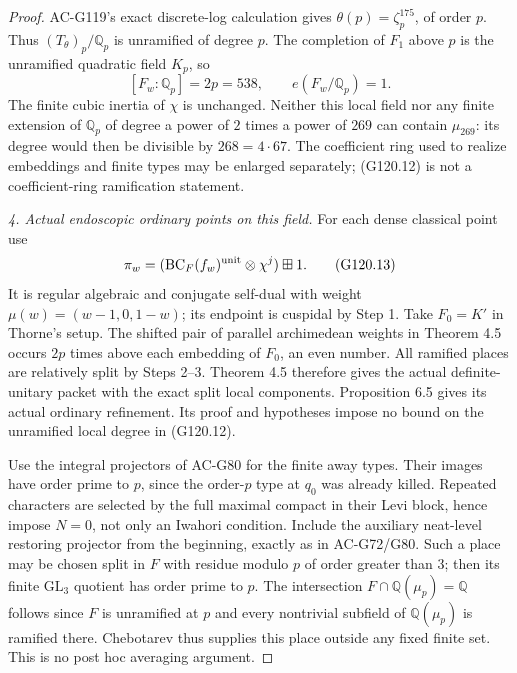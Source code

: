 \begin{proof}
AC-G119's exact discrete-log calculation gives
$\theta(p)=\zeta_p^{175}$, of order $p$.
Thus $(T_\theta)_p/\mathbb Q_p$ is unramified of degree $p$.
The completion of $F_1$ above $p$ is the unramified quadratic
field $K_p$, so
\[
                    [F_w:\mathbb Q_p]=2p=538,\qquad e(F_w/\mathbb Q_p)=1.
                                                                    \tag{G120.12}
\]
The finite cubic inertia of $\chi$ is unchanged.
Neither this local field nor any finite extension of $\mathbb Q_p$
of degree a power of $2$ times a power of $269$ can contain
$\mu_{269}$: its degree would
then be divisible by $268=4\cdot67$.
The coefficient ring used to realize embeddings and finite types
may be enlarged separately; (G120.12) is not a coefficient-ring
ramification statement.

\emph{4. Actual endoscopic ordinary points on this field.}
For each dense classical point use
\[
          \pi_w=(\operatorname{BC}_F(f_w)^{\rm unit}\otimes\chi^j)
                         \boxplus1 .                              \tag{G120.13}
\]
It is regular algebraic and conjugate self-dual with weight
$\mu(w)=(w-1,0,1-w)$; its endpoint is cuspidal by Step 1.
Take $F_0=K'$ in Thorne's setup.  The shifted pair of parallel
archimedean weights in Theorem 4.5 occurs $2p$ times above
each embedding of $F_0$, an even number.  All ramified places
are relatively split by Steps 2--3.  Theorem 4.5 therefore
gives the actual definite-unitary packet with the exact split
local components.  Proposition 6.5 gives its actual ordinary
refinement.  Its proof and hypotheses impose no bound on the
unramified local degree in (G120.12).

Use the integral projectors of AC-G80 for the finite away types.
Their images have order prime to $p$, since the order-$p$ type
at $q_0$ was already killed.  Repeated characters are selected
by the full maximal compact in their Levi block, hence impose
$N=0$, not only an Iwahori condition.  Include the auxiliary
neat-level restoring projector from the beginning, exactly as
in AC-G72/G80.  Such a place may be chosen split in $F$ with
residue modulo $p$ of order greater than $3$; then its finite
$\mathrm{GL}_3$ quotient has order prime to $p$.  The intersection
$F\cap\mathbb Q(\mu_p)=\mathbb Q$ follows since $F$ is unramified
at $p$ and every nontrivial subfield of $\mathbb Q(\mu_p)$ is
ramified there.  Chebotarev thus supplies this place outside
any fixed finite set.  This is no post hoc averaging argument.


\end{proof}
